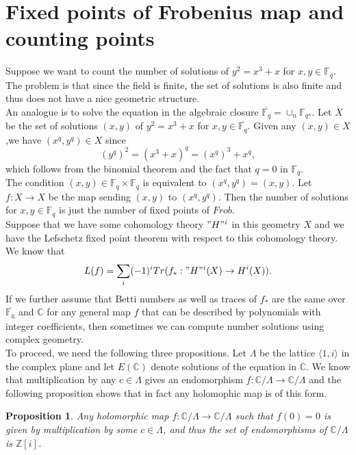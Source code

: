 \documentclass[psamsfonts]{amsart}
\newtheorem{prop}[theorem]{Proposition}
\theoremstyle{definition}
\theoremstyle{remark}
\numberwithin{equation}{section}
\begin{document}
	\section{Fixed points of Frobenius map and counting points}
	Suppose we want to count the number of solutions of $y^2 = x^3 + x $ for $x,y \in \mathbb{F}_q$. The problem is that since the field is finite, the set of solutions is also finite and thus does not have a nice geometric structure.\\ 
	\indent An analogue is to solve the equation in the algebraic closure $\overline{\mathbb{F}_q} = \cup_{n} \mathbb{F}_{q^n}$. Let $X$ be the set of solutions $(x,y)$ of $y^2 = x^3 + x$ for $x,y \in \overline{\mathbb{F}_q}$. Given any $(x,y) \in X$,we have $(x^q,y^q) \in X$ since 
	\begin{equation}
		(y^q)^2 = (x^3+x)^q = (x^q)^3 + x^q,
	\end{equation}
	which follows from the binomial theorem and the fact that $q=0$ in $\mathbb{F}_q$.\\
	\indent The condition $(x,y) \in \mathbb{F}_q \times \mathbb{F}_q$ is equivalent to $(x^q,y^q) = (x,y)$. Let $f: X \to X$ be the map sending $(x,y)$ to $(x^q,y^q)$. Then the number of solutions for $x,y \in \mathbb{F}_q$ is just the number of fixed points of $Frob$.\\
	\indent Suppose that we have some cohomology theory $"H"^i$ in this geometry $X$ and we have the Lefschetz fixed point theorem with respect to this cohomology theory. We know that 
	\begin{equation}
		L(f) = \sum_{i} (-1)^i Tr(f_* : "H"^i(X) \to H^i(X)).
	\end{equation}	
	\indent If we further assume that Betti numbers as well as traces of $f_*$ are the same over $\overline{\mathbb{F_q}}$ and $\mathbb{C}$ for any general map $f$ that can be described by polynomials with integer coefficients, then sometimes we can compute number solutions using complex geometry.\\
	
	To proceed, we need the following three propositions. Let $\Lambda$ be the lattice $\langle 1,i \rangle$ in the complex plane and let $E(\mathbb{C})$ denote solutions of the equation in $\mathbb{C}$. We know that multiplication by any $c \in \Lambda$ gives an endomorphism $f: \mathbb{C}/\Lambda \to \mathbb{C}/\Lambda$ and the following proposition shows that in fact any holomophic map is of this form.
	\begin{prop}
		Any holomorphic map $f: \mathbb{C}/ \Lambda \to \mathbb{C}/ \Lambda$ such that $f(0) = 0$ is given by multiplication by some $c \in \Lambda$, and thus the set of endomorphisms of $\mathbb{C}/ \Lambda$ is $\mathbb{Z}[i]$.
	\end{prop}
	
\end{document}
